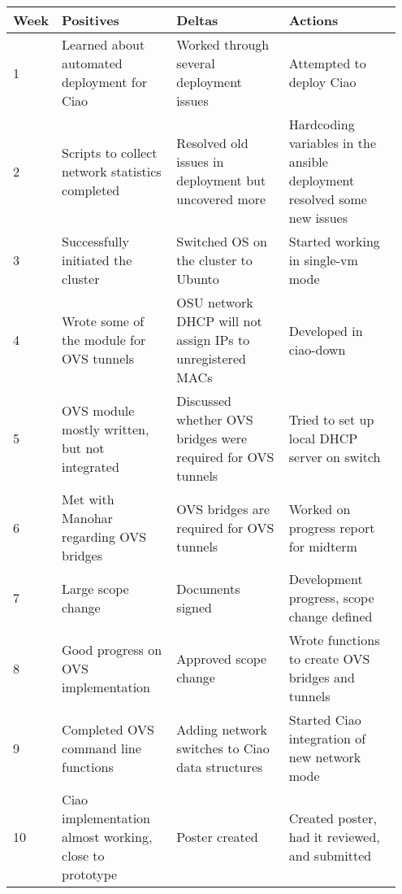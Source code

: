 \documentclass[10pt,onecolumn,journal,draftclsnofoot]{IEEEtran}
\begin{document}
\begin{center}
	\begin{tabular}{| p{0.05\linewidth} | p{0.3\linewidth} | p{0.3\linewidth} |
			p{0.3\linewidth} |}\hline
		Week & Positives & Deltas & Actions \\ \hline

		1 & Learned about automated deployment for Ciao & Worked through
		several deployment issues & Attempted to deploy Ciao \\ \hline

		2 & Scripts to collect network statistics completed & Resolved
		old issues in deployment but uncovered more & Hardcoding
		variables in the ansible deployment resolved some new issues \\
		\hline

		3 & Successfully initiated the cluster & Switched OS on the
		cluster to Ubunto & Started working in single-vm mode \\ \hline

		4 & Wrote some of the module for OVS tunnels & OSU network DHCP
		will not assign IPs to unregistered MACs & Developed in
		ciao-down \\ \hline

		5 & OVS module mostly written, but not integrated & Discussed
		whether OVS bridges were required for OVS tunnels & Tried to set
		up local DHCP server on switch \\ \hline

		6 & Met with Manohar regarding OVS bridges & OVS bridges are
		required for OVS tunnels & Worked on progress report for midterm
		\\ \hline

		7 & Large scope change & Documents signed & Development progress,
		scope change defined\\ \hline

		8 & Good progress on OVS implementation & Approved scope change
		& Wrote functions to create OVS bridges and tunnels\\ \hline

		9 & Completed OVS command line functions & Adding network switches
		to Ciao data structures & Started Ciao integration
		of new network mode\\ \hline

		10 & Ciao implementation almost working, close to prototype & 
		Poster created & Created poster, had it reviewed, and submitted\\ \hline

	\end{tabular}
\end{center}



\end{document}
